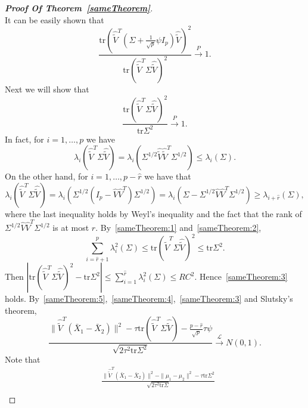 \documentclass[review]{elsarticle}
\theoremstyle{plain}
\theoremstyle{definition}
\theoremstyle{remark}
\begin{document}
\begin{proof}[\textbf{Proof Of Theorem~\ref{sameTheorem}}]
\begin{equation}
    \end{equation}
    It can be easily shown that
    \begin{equation}\label{sameTheorem:4}
    \frac{\mathrm{tr}(\hat{\tilde{V}}^T(\Sigma+\frac{1}{\sqrt{p}}\psi I_p)\hat{\tilde{V}})^2}{\mathrm{tr}(\hat{\tilde{V}}^T\Sigma\hat{\tilde{V}})^2}\xrightarrow{P}1.
\end{equation}
    Next we will show that
    \begin{equation}\label{sameTheorem:3}
    \frac{\mathrm{tr}(\hat{\tilde{V}}^T\Sigma\hat{\tilde{V}})^2}{\mathrm{tr}\Sigma^2
    }\xrightarrow{P}1.
    \end{equation}
    In fact, 
for $i=1,\ldots,p$ we have
    \begin{equation}\label{sameTheorem:1}
    \lambda_i (\hat{\tilde{V}}^T \Sigma \hat{\tilde{V}})
    =
    \lambda_i (\Sigma^{1/2} \hat{\tilde{V}}\hat{\tilde{V}}^T \Sigma^{1/2})
    \leq
    \lambda_i (\Sigma).
    \end{equation}
    On the other hand, for $i=1,\ldots,p-\hat{r}$ we have that
    \begin{equation}\label{sameTheorem:2}
    \lambda_i (\hat{\tilde{V}}^T \Sigma \hat{\tilde{V}})
    =
    \lambda_i (\Sigma^{1/2} (I_p-\hat{V}\hat{V}^T )\Sigma^{1/2})
    =
    \lambda_i (\Sigma-\Sigma^{1/2}\hat{V}\hat{V}^T\Sigma^{1/2})
    \geq
    \lambda_{i+\hat{r}} (\Sigma),
    \end{equation}
    where the last inequality holds by Weyl's inequality and the fact that the rank of $\Sigma^{1/2}\hat{V}\hat{V}^T\Sigma^{1/2}$ is at most $\hat{r}$.
    By~\eqref{sameTheorem:1} and~\eqref{sameTheorem:2},
$$
    \sum_{i=\hat{r}+1}^p \lambda_{i}^2(\Sigma)\leq \mathrm{tr}(\hat{\tilde{V}}^T\Sigma\hat{\tilde{V}})^2\leq \mathrm{tr}\Sigma^2.
    $$
    Then
    $
     |\mathrm{tr}(\hat{\tilde{V}}^T\Sigma\hat{\tilde{V}})^2- \mathrm{tr}\Sigma^2|\leq \sum_{i=1}^{\hat{r}} \lambda_{i}^2(\Sigma)\leq RC^2
    $.
    Hence~\eqref{sameTheorem:3} holds.
    By~\eqref{sameTheorem:5},~\eqref{sameTheorem:4},~\eqref{sameTheorem:3} and Slutsky's theorem, 
    \begin{equation*}
        \frac{\|\hat{\tilde{V}}^T(\bar{X}_1-\bar{X}_2)\|^2-\tau\mathrm{tr}(\hat{\tilde{V}}^T\Sigma\hat{\tilde{V}})-\frac{p-\hat{r}}{\sqrt{p}}\tau \psi }{\sqrt{2\tau^2\mathrm{tr}\Sigma^2}}\xrightarrow{\mathcal{L}}N(0,1).
    \end{equation*}
    Note that
    \begin{equation*}
        \begin{aligned}
            &\frac{\|\hat{\tilde{V}}^T(\bar{X}_1-\bar{X}_2)\|^2-\|\mu_1-\mu_2\|^2-\tau \mathrm{tr}\Sigma^2}{\sqrt{2\tau^2 \mathrm{tr}\Sigma}}\\

\end{aligned}
\end{equation*}
\end{proof}
\end{document}
